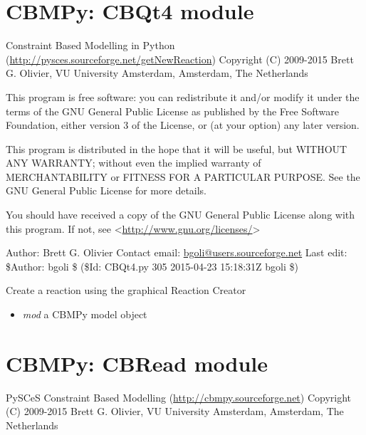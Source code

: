 \documentclass[a4paper,11pt,english]{sphinxmanual}
\begin{document}
\label{modules_doc:module-cbmpy.CBQt4}

\section{CBMPy: CBQt4 module}
\label{modules_doc:cbmpy-cbqt4-module}
Constraint Based Modelling in Python (\href{http://pysces.sourceforge.net/getNewReaction}{http://pysces.sourceforge.net/getNewReaction})
Copyright (C) 2009-2015 Brett G. Olivier, VU University Amsterdam, Amsterdam, The Netherlands

This program is free software: you can redistribute it and/or modify
it under the terms of the GNU General Public License as published by
the Free Software Foundation, either version 3 of the License, or
(at your option) any later version.

This program is distributed in the hope that it will be useful,
but WITHOUT ANY WARRANTY; without even the implied warranty of
MERCHANTABILITY or FITNESS FOR A PARTICULAR PURPOSE.  See the
GNU General Public License for more details.

You should have received a copy of the GNU General Public License
along with this program.  If not, see \textless{}\href{http://www.gnu.org/licenses/}{http://www.gnu.org/licenses/}\textgreater{}

Author: Brett G. Olivier
Contact email: \href{mailto:bgoli@users.sourceforge.net}{bgoli@users.sourceforge.net}
Last edit: \$Author: bgoli \$ (\$Id: CBQt4.py 305 2015-04-23 15:18:31Z bgoli \$)

\begin{fulllineitems}
\label{modules_doc:cbmpy.CBQt4.createReaction}
Create a reaction using the graphical Reaction Creator
\begin{itemize}
\item {} 
\emph{mod} a CBMPy model object

\end{itemize}

\end{fulllineitems}

\label{modules_doc:module-cbmpy.CBRead}

\section{CBMPy: CBRead module}
\label{modules_doc:cbmpy-cbread-module}
PySCeS Constraint Based Modelling (\href{http://cbmpy.sourceforge.net}{http://cbmpy.sourceforge.net})
Copyright (C) 2009-2015 Brett G. Olivier, VU University Amsterdam, Amsterdam, The Netherlands
\end{document}

